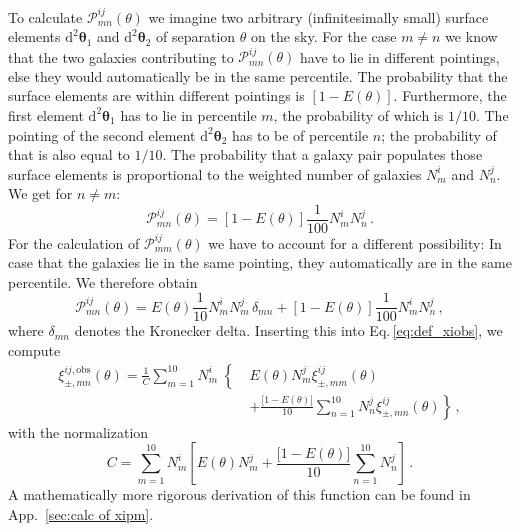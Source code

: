 \documentclass{aa}
\renewcommand{\rm}{\mathrm}
\def\b#1{\bm{#1}}
\def\d{\rm{d}}
\begin{document}
To calculate $\mathcal{P}_{mn}^{ij}(\theta)$ we imagine two arbitrary (infinitesimally small) surface elements $\d^2\b\theta_1$ and $\d^2\b\theta_2$ of separation $\theta$ on the sky. For the case $m\neq n$ we know that the two galaxies contributing to $\mathcal{P}_{mn}^{ij}(\theta)$ have to lie in different pointings, else they would automatically be in the same percentile. The probability that the surface elements are within different pointings is $[1-E(\theta)]$. Furthermore, the first element $\d^2\b\theta_1$ has to lie in percentile $m$, the probability of which is $1/10$. The pointing of the second element $\d^2\b\theta_2$ has to be of percentile $n$; the probability of that is also equal to $1/10$. The probability that a galaxy pair populates those surface elements is proportional to the weighted number of galaxies $N_m^i$ and $N_n^j$. We get for $n\neq m$: \begin{equation}
\mathcal{P}_{mn}^{ij}(\theta) = [1-E(\theta)]\frac{1}{100} N_m^i N_n^j\, .
\label{eq:pmnij_corr1}
\end{equation}
For the calculation of $\mathcal{P}_{mm}^{ij}(\theta)$ we have to account for a different possibility: In case that the galaxies lie in the same pointing, they automatically are in the same percentile. We therefore obtain \begin{equation}
\mathcal{P}_{mn}^{ij}(\theta) = E(\theta)\frac{1}{10} N_m^iN_m^j\,\delta_{mn} + [1-E(\theta)]\frac{1}{100} N_m^i N_n^j \, ,
\label{eq:pmnij_uncorr}
\end{equation}
where $\delta_{mn}$ denotes the Kronecker delta.
Inserting this into Eq.\,\eqref{eq:def_xiobs}, we compute
\begin{align}
\xi_{\pm,mn}^{ij,\rm{obs}}(\theta) =  \left.\frac{1}{C}\sum_{m=1}^{10} N_m^i \right\{ & E(\theta) N_m^j \xi_{\pm,mm}^{ij}(\theta) \nonumber\\
 & \left. + \frac{\big[1-E(\theta)\big]}{10}\sum_{n=1}^{10}N_n^j \xi_{\pm,mn}^{ij}(\theta)\right\}\, ,
\label{eq:correctionfunction1}
\end{align}
with the normalization
\begin{equation}
C = \sum_{m=1}^{10} N_m^i \left[ E(\theta)  N_m^j + \frac{\big[1-E(\theta)\big]}{10}\sum_{n=1}^{10} N_n^j\right]\, .
\end{equation}
A mathematically more rigorous derivation of this function can be found in App.~\ref{sec:calc of xipm}.
\end{document}
